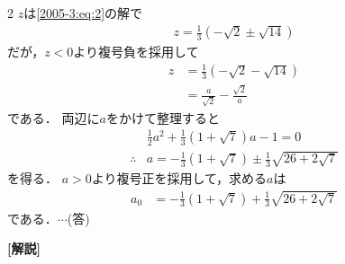 \documentclass[../../../../main.tex]{subfiles}
\begin{document}
\begin{multicols}{2}
  $z$は\cref{2005-3:eq:2}の解で
  \begin{align*}
    z = \frac{1}{3}\left(-\sqrt{2} \pm \sqrt{14}\right)
  \end{align*}
  だが，$z<0$より複号負を採用して
  \begin{align*}
    z
     & = \frac{1}{3}\left(-\sqrt{2} - \sqrt{14}\right) \\
     & = \frac{a}{\sqrt{2}} - \frac{\sqrt{2}}{a}
  \end{align*}
  である．
  両辺に$a$をかけて整理すると
  \begin{align*}
     & \frac{1}{2}a^2 + \frac{1}{3}\left(1+\sqrt{7}\right)a -1 = 0      \\
    \therefore
     & a = - \frac{1}{3}(1+\sqrt{7}) \pm \frac{1}{3}\sqrt{26+2\sqrt{7}}
  \end{align*}
  を得る．
  $a>0$より複号正を採用して，求める$a$は
  \begin{align*}
    a_0
     & = -\frac{1}{3}(1+\sqrt{7}) + \frac{1}{3}\sqrt{26+2\sqrt{7}}
  \end{align*}
  である．$\cdots$(答)

  \vspace{10pt}
  {\bf[解説]}



  \newpage
\end{multicols}
\end{document}

